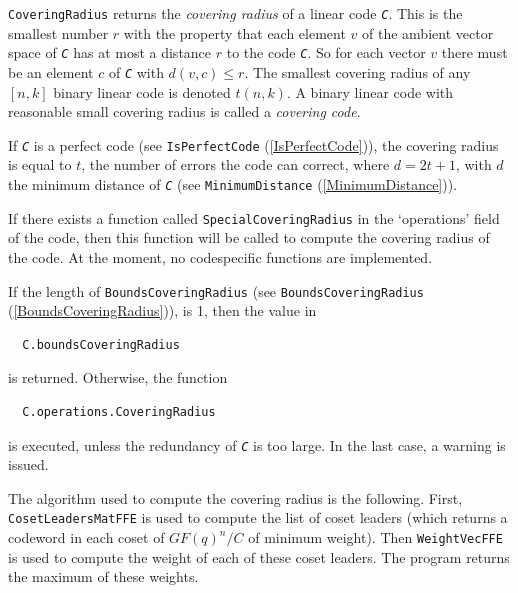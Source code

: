 \documentclass[a4paper,11pt]{report}
\begin{document}
{{{ \texttt{CoveringRadius} returns the \emph{covering radius} of a linear code \mbox{\texttt{\mdseries\slshape C}}. This is the smallest number $r$ with the property that each element $v$ of the ambient vector space of \mbox{\texttt{\mdseries\slshape C}} has at most a distance $r$ to the code \mbox{\texttt{\mdseries\slshape C}}. So for each vector $v$ there must be an element $c$ of \mbox{\texttt{\mdseries\slshape C}} with $d(v,c) \leq r$. The smallest covering radius of any $[n,k]$ binary linear code is denoted $t(n,k)$. A binary linear code with reasonable small covering radius is called a \emph{covering code}. 

 If \mbox{\texttt{\mdseries\slshape C}} is a perfect code (see \texttt{IsPerfectCode} (\ref{IsPerfectCode})), the covering radius is equal to $t$, the number of errors the code can correct, where $d = 2t+1$, with $d$ the minimum distance of \mbox{\texttt{\mdseries\slshape C}} (see \texttt{MinimumDistance} (\ref{MinimumDistance})). 

 If there exists a function called \texttt{SpecialCoveringRadius} in the `operations' field of the code, then this function will be called to
compute the covering radius of the code. At the moment, no
code\texttt{}specific functions are implemented. 

 If the length of \texttt{BoundsCoveringRadius} (see \texttt{BoundsCoveringRadius} (\ref{BoundsCoveringRadius})), is 1, then the value in 
\begin{verbatim}  
  C.boundsCoveringRadius
\end{verbatim}
 is returned. Otherwise, the function 
\begin{verbatim}  
  C.operations.CoveringRadius
\end{verbatim}
 is executed, unless the redundancy of \mbox{\texttt{\mdseries\slshape C}} is too large. In the last case, a warning is issued. 

 The algorithm used to compute the covering radius is the following. First, \texttt{CosetLeadersMatFFE} is used to compute the list of coset leaders (which returns a codeword in each
coset of $GF(q)^n/C$ of minimum weight). Then \texttt{WeightVecFFE} is used to compute the weight of each of these coset leaders. The program
returns the maximum of these weights.  }

}}
\end{document}
